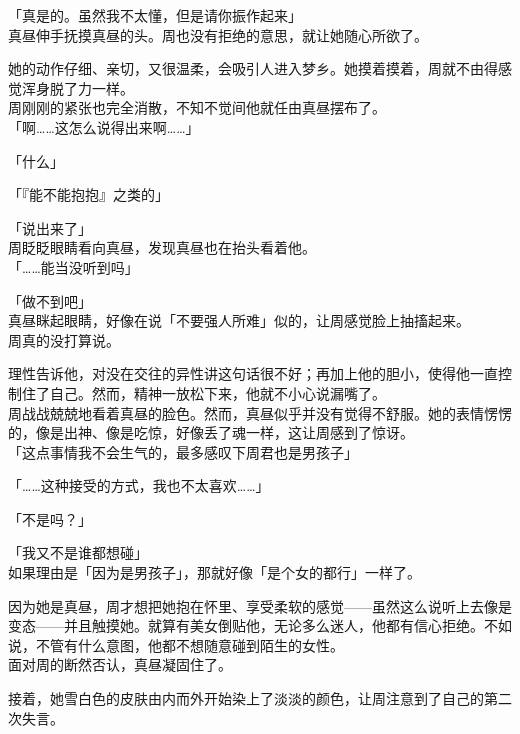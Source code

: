 「真是的。虽然我不太懂，但是请你振作起来」\\

真昼伸手抚摸真昼的头。周也没有拒绝的意思，就让她随心所欲了。

她的动作仔细、亲切，又很温柔，会吸引人进入梦乡。她摸着摸着，周就不由得感觉浑身脱了力一样。\\

周刚刚的紧张也完全消散，不知不觉间他就任由真昼摆布了。\\

「啊……这怎么说得出来啊……」

「什么」

「『能不能抱抱』之类的」

「说出来了」\\

周眨眨眼睛看向真昼，发现真昼也在抬头看着他。\\

「……能当没听到吗」

「做不到吧」\\

真昼眯起眼睛，好像在说「不要强人所难」似的，让周感觉脸上抽搐起来。\\

周真的没打算说。

理性告诉他，对没在交往的异性讲这句话很不好；再加上他的胆小，使得他一直控制住了自己。然而，精神一放松下来，他就不小心说漏嘴了。\\

周战战兢兢地看着真昼的脸色。然而，真昼似乎并没有觉得不舒服。她的表情愣愣的，像是出神、像是吃惊，好像丢了魂一样，这让周感到了惊讶。\\

「这点事情我不会生气的，最多感叹下周君也是男孩子」

「……这种接受的方式，我也不太喜欢……」

「不是吗？」

「我又不是谁都想碰」\\

如果理由是「因为是男孩子」，那就好像「是个女的都行」一样了。

因为她是真昼，周才想把她抱在怀里、享受柔软的感觉——虽然这么说听上去像是变态——并且触摸她。就算有美女倒贴他，无论多么迷人，他都有信心拒绝。不如说，不管有什么意图，他都不想随意碰到陌生的女性。\\

面对周的断然否认，真昼凝固住了。

接着，她雪白色的皮肤由内而外开始染上了淡淡的颜色，让周注意到了自己的第二次失言。\\


